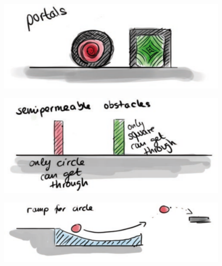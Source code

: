 \documentclass[12pt,a4paper]{scrartcl}
\begin{document}
\begin{figure}[!h]
    \includegraphics[width=\textwidth]{portals.pdf}
\end{figure}

\begin{figure}[!h]
    \includegraphics[width=\textwidth]{semi.pdf}
\end{figure}

\begin{figure}[!h]
    \includegraphics[width=\textwidth]{ramp.pdf}
\end{figure}
\end{document}
